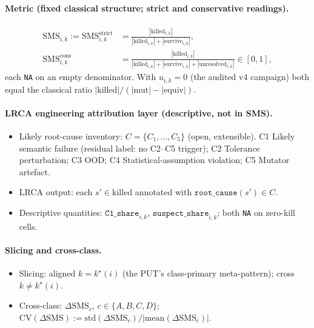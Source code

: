 \documentclass[review,12pt,authoryear]{elsarticle}
\begin{document}
\paragraph{Metric (fixed classical structure; strict and conservative readings).}
\begin{align*}
\mathrm{SMS}_{i,k} := \mathrm{SMS}^{\mathrm{strict}}_{i,k} &= \frac{|\mathrm{killed}_{i,k}|}{|\mathrm{killed}_{i,k}| + |\mathrm{survive}_{i,k}|}, \\
\mathrm{SMS}^{\mathrm{cons}}_{i,k} &= \frac{|\mathrm{killed}_{i,k}|}{|\mathrm{killed}_{i,k}| + |\mathrm{survive}_{i,k}| + |\mathrm{unresolved}_{i,k}|} \in [0, 1],
\end{align*}
each \texttt{NA} on an empty denominator. With $u_{i,k} = 0$ (the
audited v4 campaign) both equal the classical ratio
$|\mathrm{killed}|/(|\mathrm{mut}| - |\mathrm{equiv}|)$.

\paragraph{LRCA engineering attribution layer (descriptive, not in SMS).}
\begin{itemize}
\item Likely root-cause inventory: $C = \{C_1, \ldots, C_5\}$ (open, extensible). C1 Likely semantic failure (residual label: no C2--C5 trigger); C2 Tolerance perturbation; C3 OOD; C4 Statistical-assumption violation; C5 Mutator artefact.
\item LRCA output: each $s' \in \mathrm{killed}$ annotated with $\texttt{root\_cause}(s') \in C$.
\item Descriptive quantities: $\texttt{C1\_share}_{i,k}$, $\texttt{suspect\_share}_{i,k}$; both \texttt{NA} on zero-kill cells.
\end{itemize}

\paragraph{Slicing and cross-class.}
\begin{itemize}
\item Slicing: aligned $k = k^\star(i)$ (the PUT's class-primary meta-pattern); cross $k \neq k^\star(i)$.
\item Cross-class: $\Delta\mathrm{SMS}_c$, $c \in \{A, B, C, D\}$; $\mathrm{CV}(\Delta\mathrm{SMS}) := \mathrm{std}(\Delta\mathrm{SMS}_c) / |\mathrm{mean}(\Delta\mathrm{SMS}_c)|$.
\end{itemize}
\end{document}

